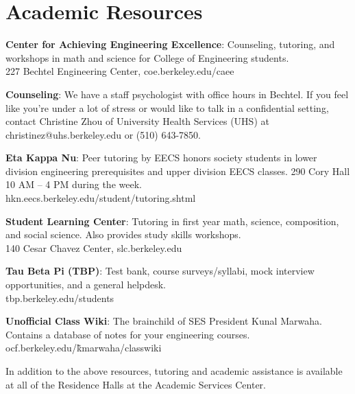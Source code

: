 \chapter*{Academic Resources}

\textbf{Center for Achieving Engineering Excellence}: Counseling, tutoring, and workshops in math and science for College of Engineering students. \\
227 Bechtel Engineering Center, {\selectfont coe.berkeley.edu/caee} 

\textbf{Counseling}: We have a staff psychologist with office hours in Bechtel. If you feel like you’re under a lot of stress or would like to talk in a confidential setting, contact Christine Zhou of University Health Services (UHS) at {\selectfont christinez@uhs.berkeley.edu} or (510) 643-7850.

\textbf{Eta Kappa Nu}: Peer tutoring by EECS honors society students in lower division engineering prerequisites and upper division EECS classes. 290 Cory Hall 10 AM – 4 PM during the week. \\
{\selectfont hkn.eecs.berkeley.edu/student/tutoring.shtml} 

\textbf{Student Learning Center}: Tutoring in first year math, science, composition, and social science. Also provides study skills workshops. \\
140 Cesar Chavez Center, {\selectfont slc.berkeley.edu}

\textbf{Tau Beta Pi (TBP)}: Test bank, course surveys/syllabi, mock interview opportunities, and a general helpdesk. \\
{\selectfont tbp.berkeley.edu/students}

\textbf{Unofficial Class Wiki}: The brainchild of SES President Kunal Marwaha. Contains a database of notes for your engineering courses. \\
{\selectfont ocf.berkeley.edu/\~kmarwaha/classwiki}

In addition to the above resources, tutoring and academic assistance is available at all of the Residence Halls at the Academic Services Center.

